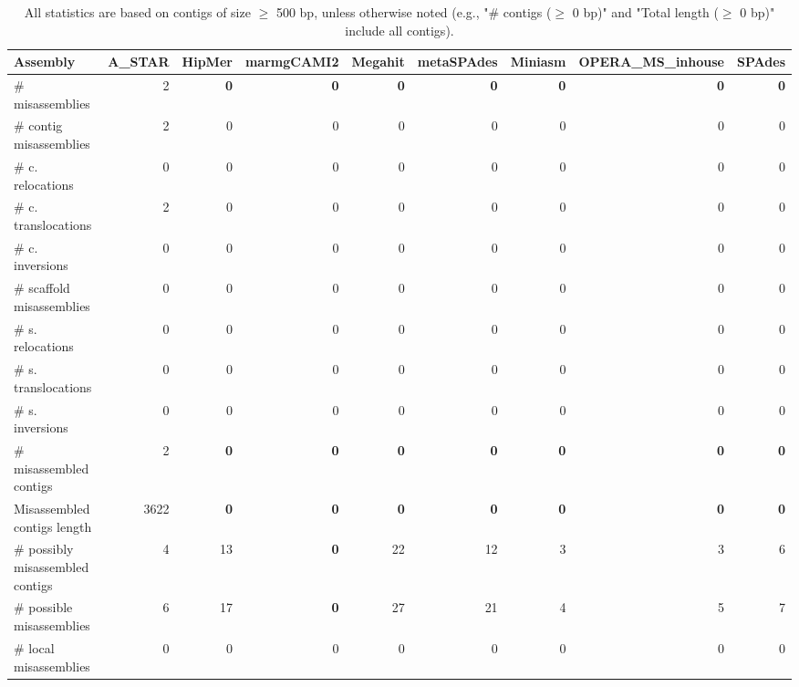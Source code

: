 \documentclass[12pt,a4paper]{article}
\begin{document}
\begin{table}[ht]
\begin{center}
\caption{All statistics are based on contigs of size $\geq$ 500 bp, unless otherwise noted (e.g., "\# contigs ($\geq$ 0 bp)" and "Total length ($\geq$ 0 bp)" include all contigs).}
\begin{tabular}{|l*{8}{|r}|}
\hline
Assembly & A\_STAR & HipMer & marmgCAMI2 & Megahit & metaSPAdes & Miniasm & OPERA\_MS\_inhouse & SPAdes \\ \hline
\# misassemblies & 2 & {\bf 0} & {\bf 0} & {\bf 0} & {\bf 0} & {\bf 0} & {\bf 0} & {\bf 0} \\ \hline
\hspace{2mm}\# contig misassemblies & 2 & 0 & 0 & 0 & 0 & 0 & 0 & 0 \\ \hline
\hspace{5mm}\# c. relocations & 0 & 0 & 0 & 0 & 0 & 0 & 0 & 0 \\ \hline
\hspace{5mm}\# c. translocations & 2 & 0 & 0 & 0 & 0 & 0 & 0 & 0 \\ \hline
\hspace{5mm}\# c. inversions & 0 & 0 & 0 & 0 & 0 & 0 & 0 & 0 \\ \hline
\hspace{2mm}\# scaffold misassemblies & 0 & 0 & 0 & 0 & 0 & 0 & 0 & 0 \\ \hline
\hspace{5mm}\# s. relocations & 0 & 0 & 0 & 0 & 0 & 0 & 0 & 0 \\ \hline
\hspace{5mm}\# s. translocations & 0 & 0 & 0 & 0 & 0 & 0 & 0 & 0 \\ \hline
\hspace{5mm}\# s. inversions & 0 & 0 & 0 & 0 & 0 & 0 & 0 & 0 \\ \hline
\# misassembled contigs & 2 & {\bf 0} & {\bf 0} & {\bf 0} & {\bf 0} & {\bf 0} & {\bf 0} & {\bf 0} \\ \hline
Misassembled contigs length & 3622 & {\bf 0} & {\bf 0} & {\bf 0} & {\bf 0} & {\bf 0} & {\bf 0} & {\bf 0} \\ \hline
\# possibly misassembled contigs & 4 & 13 & {\bf 0} & 22 & 12 & 3 & 3 & 6 \\ \hline
\hspace{5mm}\# possible misassemblies & 6 & 17 & {\bf 0} & 27 & 21 & 4 & 5 & 7 \\ \hline
\# local misassemblies & 0 & 0 & 0 & 0 & 0 & 0 & 0 & 0 \\ \hline

\end{tabular}
\end{center}
\end{table}
\end{document}
